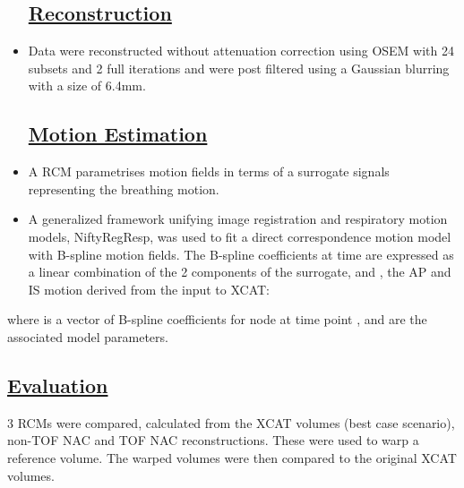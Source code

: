 \documentclass[portrait,color=UCLburgundy,margin=2cm]{uclposter}
\begin{document}
\begin{multicols}{2}
\begin{itemize}
    \subsection*{\underline{\textbf{Reconstruction}}}
    \item Data were reconstructed without attenuation correction using OSEM with 24 subsets and 2 full iterations and were post filtered using a Gaussian blurring with a size of 6.4mm.
    
    \subsection*{\underline{\textbf{Motion Estimation}}}
    \item A \gls{RCM} parametrises motion fields in terms of a surrogate signals representing the breathing motion.
    \item A generalized framework unifying image registration and respiratory motion models, NiftyRegResp, \cite{McClelland2017} was used to fit a direct correspondence motion model with B-spline motion fields. The B-spline coefficients at time  are expressed as a linear combination of the 2 components of the surrogate,  and , the \gls{AP} and \gls{IS} motion derived from the input to XCAT:
\end{itemize}

\vspace{-2.0cm}
    
\begin{center}
\end{center}

\vspace{-1.0cm}
    
\indent where  is a vector of B-spline coefficients for node  at time point , and  are the associated model parameters.
    
\begin{highlightbox}[UCLlightgreen]
    \subsection*{\underline{\textbf{Evaluation}}}
    3 \gls{RCM}s were compared, calculated from the XCAT volumes (best case scenario), non-\gls{TOF} \gls{NAC} and \gls{TOF} \gls{NAC} reconstructions. These were used to warp a reference volume. The warped volumes were then compared to the original XCAT volumes.
\end{highlightbox}

\end{multicols}
\end{document}
